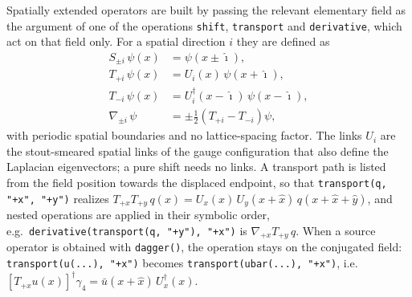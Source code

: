\documentclass[a4paper,fleqn]{cas-dc}
\begin{document}
Spatially extended operators are built by passing the relevant elementary field as the argument of one of the operations \texttt{shift}, \texttt{transport} and \texttt{derivative}, which act on that field only. \begingroup\color{blue}For a spatial direction $i$ they are defined as
\begin{align}
S_{\pm i}\,\psi(x) &= \psi(x\pm\hat\imath), \nonumber\\
T_{+i}\,\psi(x) &= U_i(x)\,\psi(x+\hat\imath), \nonumber\\
T_{-i}\,\psi(x) &= U_i^\dagger(x-\hat\imath)\,\psi(x-\hat\imath), \label{eq:transport_conventions}\\
\nabla_{\pm i}\,\psi &= \pm\tfrac12\left(T_{+i}-T_{-i}\right)\psi, \nonumber
\end{align}
with periodic spatial boundaries and no lattice-spacing factor. The links $U_i$ are the stout-smeared spatial links of the gauge configuration that also define the Laplacian eigenvectors; a pure shift needs no links. A transport path is listed from the field position towards the displaced endpoint, so that \texttt{transport(q, "+x", "+y")} realizes $T_{+x}T_{+y}\,q(x)=U_x(x)\,U_y(x+\hat x)\,q(x+\hat x+\hat y)$, and nested operations are applied in their symbolic order, e.g.\ \texttt{derivative(transport(q, "+y"), "+x")} is $\nabla_{+x}T_{+y}\,q$. When a source operator is obtained with \texttt{dagger()}, the operation stays on the conjugated field: \texttt{transport(u(...), "+x")} becomes \texttt{transport(ubar(...), "+x")}, i.e.\ $[T_{+x}u(x)]^\dagger\gamma_4=\bar u(x+\hat x)\,U_x^\dagger(x)$.\endgroup
\end{document}
